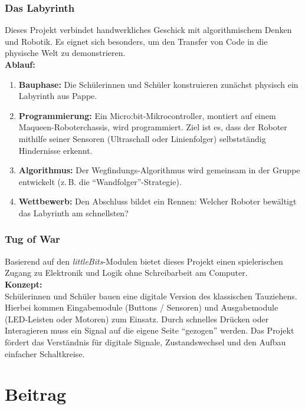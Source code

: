 \documentclass[a5paper,pagesize,10pt,bibtotoc,pointlessnumbers,
normalheadings,DIV=9,twoside=false]{scrbook}
\begin{document}
\subsection*{Das Labyrinth}

Dieses Projekt verbindet handwerkliches Geschick mit algorithmischem Denken und Robotik. Es eignet sich besonders, um den Transfer von Code in die physische Welt zu demonstrieren.\\

\textbf{Ablauf:}
\begin{enumerate}
    \item \textbf{Bauphase:} Die Schülerinnen und Schüler konstruieren zunächst physisch ein Labyrinth aus Pappe.
    \item \textbf{Programmierung:} Ein Micro:bit-Mikrocontroller, montiert auf einem Maqueen-Roboterchassis, wird programmiert. Ziel ist es, dass der Roboter mithilfe seiner Sensoren (Ultraschall oder Linienfolger) selbstständig Hindernisse erkennt.
    \item \textbf{Algorithmus:} Der Wegfindungs-Algorithmus wird gemeinsam in der Gruppe entwickelt (z.\,B. die ``Wandfolger''-Strategie).
    \item \textbf{Wettbewerb:} Den Abschluss bildet ein Rennen: Welcher Roboter bewältigt das Labyrinth am schnellsten?
\end{enumerate}

\subsection*{Tug of War}

Basierend auf den \textit{littleBits}-Modulen bietet dieses Projekt einen spielerischen Zugang zu Elektronik und Logik ohne Schreibarbeit am Computer.\\

\textbf{Konzept:}\\
Schülerinnen und Schüler bauen eine digitale Version des klassischen Tauziehens. Hierbei kommen Eingabemodule (Buttons / Sensoren) und Ausgabemodule (LED-Leisten oder Motoren) zum Einsatz. Durch schnelles Drücken oder Interagieren muss ein Signal auf die eigene Seite ``gezogen'' werden. Das Projekt fördert das Verständnis für digitale Signale, Zustandswechsel und den Aufbau einfacher Schaltkreise.

\chapter{Beitrag}
\end{document}
